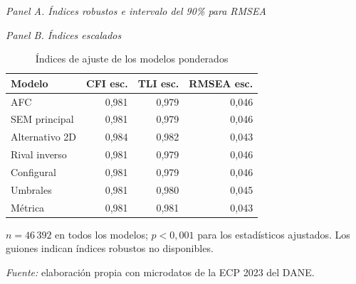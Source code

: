 \begin{table}[htbp]\centering\small
\caption{Índices de ajuste de los modelos ponderados}\label{tab:ajuste}
\textit{Panel A. Índices robustos e intervalo del 90\% para RMSEA}\par\smallskip

\par\medskip
\textit{Panel B. Índices escalados}\par\smallskip

\begin{tabular}{lrrr}
\toprule
Modelo & CFI esc. & TLI esc. & RMSEA esc.\\
\midrule
AFC & 0,981 & 0,979 & 0,046\\
SEM principal & 0,981 & 0,979 & 0,046\\
Alternativo 2D & 0,984 & 0,982 & 0,043\\
Rival inverso & 0,981 & 0,979 & 0,046\\
Configural & 0,981 & 0,979 & 0,046\\
\addlinespace
Umbrales & 0,981 & 0,980 & 0,045\\
Métrica & 0,981 & 0,981 & 0,043\\
\bottomrule
\end{tabular}
\par\smallskip\footnotesize $n=46\,392$ en todos los modelos; $p<0{,}001$ para los estadísticos ajustados. Los guiones indican índices robustos no disponibles.
\par\smallskip\noindent\parbox{\linewidth}{\footnotesize\textit{Fuente:} elaboración propia con microdatos de la ECP 2023 del DANE.}
\end{table}
